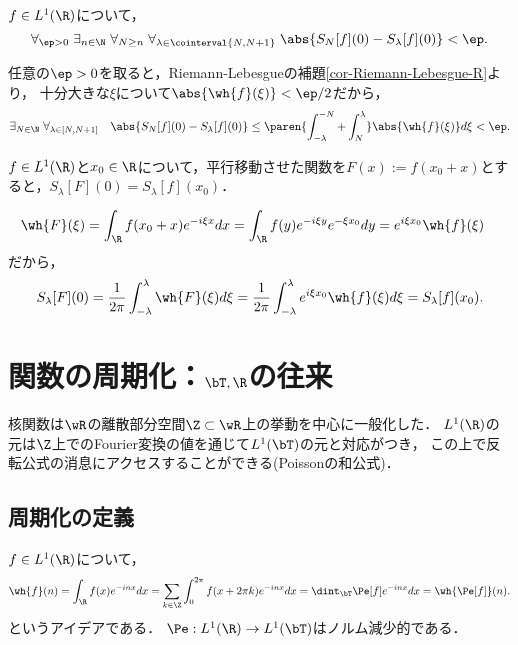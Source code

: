 \documentclass[uplatex,dvipdfmx]{jsreport}
\begin{document}
\begin{lemma}[Fourier部分和の差の収束２]
    $f\in L^1(\R)$について，
    \[\forall_{\ep>0}\;\exists_{n\in\N}\;\forall_{N\ge n}\;\forall_{\lambda\in\cointerval{N,N+1}}\;\abs{S_N[f](0)-S_\lambda[f](0)}<\ep.\]
\end{lemma}
\begin{Proof}
    任意の$\ep>0$を取ると，Riemann-Lebesgueの補題\ref{cor-Riemann-Lebesgue-R}より，
    十分大きな$\xi$について$\abs{\wh{f}(\xi)}<\ep/2$だから，
    \[\exists_{N\in\N}\;\forall_{\lambda\in[N,N+1]}\quad\abs{S_N[f](0)-S_\lambda[f](0)}\le\paren{\int^{-N}_{-\lambda}+\int^\lambda_{N}}\abs{\wh{f}(\xi)}d\xi<\ep.\]
\end{Proof}

\begin{lemma}[平行移動させた関数のFourier部分和]
    $f\in L^1(\R)$と$x_0\in\R$について，平行移動させた関数を$F(x):=f(x_0+x)$とすると，$S_\lambda[F](0)=S_\lambda[f](x_0)$．
\end{lemma}
\begin{Proof}
    \begin{align*}
        \wh{F}(\xi)&=\int_\R f(x_0+x)e^{-i\xi x}dx=\int_\R f(y)e^{-i\xi y}e^{-\xi x_0}dy=e^{i\xi x_0}\wh{f}(\xi)
    \end{align*}
    だから，
    \[S_\lambda[F](0)=\frac{1}{2\pi}\int^\lambda_{-\lambda}\wh{F}(\xi)d\xi=\frac{1}{2\pi}\int^\lambda_{-\lambda}e^{i\xi x_0}\wh{f}(\xi)d\xi=S_\lambda[f](x_0).\]
\end{Proof}

\section{関数の周期化：$\bT,\R$の往来}

\begin{tcolorbox}[colframe=ForestGreen, colback=ForestGreen!10!white,breakable,colbacktitle=ForestGreen!40!white,coltitle=black,fonttitle=\bfseries\sffamily,
title=]
    核関数は$\wR$の離散部分空間$\Z\subset\wR$上の挙動を中心に一般化した．
    $L^1(\R)$の元は$\Z$上でのFourier変換の値を通じて$L^1(\bT)$の元と対応がつき，
    この上で反転公式の消息にアクセスすることができる(Poissonの和公式)．
\end{tcolorbox}

\subsection{周期化の定義}

\begin{tcolorbox}[colframe=ForestGreen, colback=ForestGreen!10!white,breakable,colbacktitle=ForestGreen!40!white,coltitle=black,fonttitle=\bfseries\sffamily,
title=]
    $f\in L^1(\R)$について，
    \[\wh{f}(n)=\int_\R f(x)e^{-inx}dx=\sum_{k\in\Z}\int^{2\pi}_0f(x+2\pi k)e^{-inx}dx=\dint_\bT\Pe[f]e^{-inx}dx=\wh{\Pe[f]}(n).\]
    というアイデアである．
    $\Pe:L^1(\R)\to L^1(\bT)$はノルム減少的である．
\end{tcolorbox}
\end{document}
